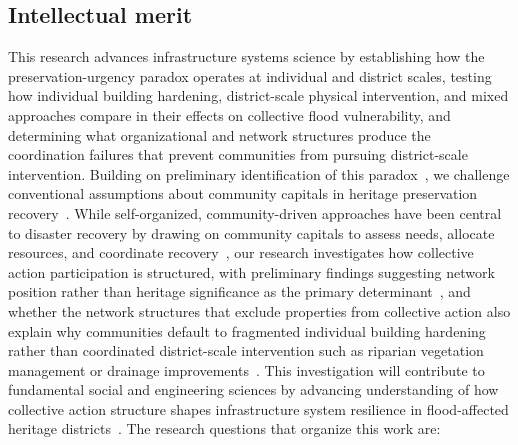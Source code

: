 \documentclass[11pt]{article}
\begin{document}
\vspace{-0.4cm}
\subsection{Intellectual merit}
This research advances infrastructure systems science by establishing how the
preservation-urgency paradox operates at individual and district scales, testing
how individual building hardening, district-scale physical intervention, and mixed
approaches compare in their effects on collective flood vulnerability, and determining
what organizational and network structures produce the coordination failures that
prevent communities from pursuing district-scale intervention.
Building on preliminary identification of this paradox~\cite{maalouf2025a,maalouf2025b},
we challenge conventional assumptions about community capitals in heritage preservation
recovery~\cite{MurzynKupisz2013,HistoricEngland2023}.
While self-organized, community-driven approaches have been central to disaster recovery
by drawing on community capitals to assess needs, allocate resources, and coordinate
recovery~\cite{imperiale2016experiencing}, our research investigates how collective action
participation is structured, with preliminary findings suggesting network position rather
than heritage significance as the primary determinant~\cite{maalouf2025a,maalouf2025b},
and whether the network structures that exclude properties from collective action also
explain why communities default to fragmented individual building hardening rather than
coordinated district-scale intervention such as riparian vegetation management or drainage
improvements~\cite{Hou2023,UNESCO2024}.
This investigation will contribute to fundamental social and engineering sciences by
advancing understanding of how collective action structure shapes infrastructure system
resilience in flood-affected heritage districts~\cite{moya2022approach,aldrich2015social,cleaver2002reinventing}.
The research questions that organize this work are:
\newpage
\end{document}
